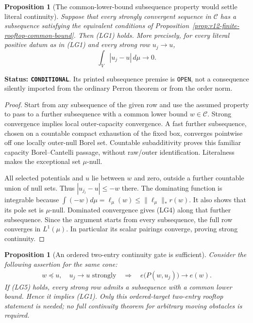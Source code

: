 \documentclass[11pt,a4paper]{article}
\numberwithin{equation}{section}
\newtheorem{proposition}[theorem]{Proposition}
\theoremstyle{definition}
\theoremstyle{remark}
\begin{document}
\begin{proposition}[The common-lower-bound subsequence property would settle literal continuity]
\label{prop:r12-common-bound-literal-continuity}
Suppose that every strongly convergent sequence in
$\mathscr C$ has a subsequence satisfying the equivalent
conditions of Proposition~\ref{prop:r12-finite-rooftop-common-bound}.  Then
\textup{(LG1)} holds.  More precisely, for every literal
positive datum as in \textup{(LG1)} and every strong
row $u_j\to u$,
\[
                         \int_V|u_j-u|\,d\mu\longrightarrow0.
 \tag{LG4}
\]
\end{proposition}

\noindent\textbf{Status: \texttt{CONDITIONAL}}.  Its
printed subsequence premise is \texttt{OPEN}, not a
consequence silently imported from the ordinary
Perron theorem or from the order norm.

\begin{proof}
Start from any subsequence of the given row and use
the assumed property to pass to a further subsequence
with a common lower bound $w\in\mathscr C$.
Strong convergence implies local outer-capacity
convergence.  A fast further subsequence, chosen on
a countable compact exhaustion of the fixed box,
converges pointwise off one locally outer-null Borel
set.  Countable subadditivity proves this familiar
capacity Borel--Cantelli passage, without raw/outer
identification.  Literalness makes the exceptional
set $\mu$-null.

All selected potentials and $u$ lie between $w$ and
zero, outside a further countable union of null sets.
Thus $|u_{j_l}-u|\le -w$ there.  The dominating
function is integrable because
$\int(-w)d\mu=\ell_\mu(w)\le\|\ell_\mu\|_*r(w)$.
It also shows that its pole set is $\mu$-null.
Dominated convergence gives \textup{(LG4)} along
that further subsequence.  Since the argument starts
from every subsequence, the full row converges in
$L^1(\mu)$.  In particular its scalar pairings
converge, proving strong continuity.
\end{proof}

\begin{proposition}[An ordered two-entry continuity gate is sufficient]
\label{prop:r12-ordered-rooftop-reduction}
Consider the following assertion for the same cone:
\[
 \begin{gathered}
 w\preceq u,\quad u_j\longrightarrow u\text{ strongly}
 \quad\Longrightarrow\quad
        e\bigl(P(w,u_j)\bigr)\longrightarrow e(w).
 \end{gathered}
 \tag{LG5}
\]
If \textup{(LG5)} holds, every strong row admits a
subsequence with a common lower bound.  Hence it
implies \textup{(LG1)}.  Only this ordered-target
two-entry rooftop statement is needed; no full
continuity theorem for arbitrary moving obstacles
is required.
\end{proposition}
\end{document}
